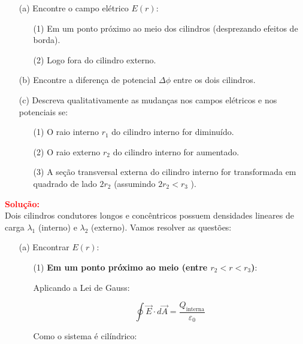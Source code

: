 \documentclass[a4paper,12pt]{article}
\begin{document}
\begin{flushleft}
\begin{enumerate}
    \item[(a)] Encontre o campo elétrico \( E(r) \):
    \begin{enumerate}
        \item[(1)] Em um ponto próximo ao meio dos cilindros (desprezando efeitos de borda).
        \item[(2)] Logo fora do cilindro externo.
    \end{enumerate}

    \item[(b)] Encontre a diferença de potencial $\Delta\phi$ entre os dois cilindros.

    \item[(c)] Descreva qualitativamente as mudanças nos campos elétricos e nos potenciais se:
    \begin{enumerate}
        \item[(1)] O raio interno \( r_1 \) do cilindro interno for diminuído.
        \item[(2)] O raio externo \( r_2 \) do cilindro interno for aumentado.
        \item[(3)] A seção transversal externa do cilindro interno for transformada em
                   quadrado de lado \( 2r_2 \) (assumindo \( 2r_2 < r_3 \) ).
    \end{enumerate}
\end{enumerate}

\textcolor{red}{\textbf{Solução:}}\\

Dois cilindros condutores longos e concêntricos possuem densidades lineares de carga $\lambda_1$ (interno) e $\lambda_2$ (externo). Vamos resolver as questões:

\begin{itemize}
    \item[(a)] Encontrar $E(r)$:

    \begin{itemize}
        \item[(1)] \textbf{Em um ponto próximo ao meio (entre $r_2 < r < r_3$)}:

        Aplicando a Lei de Gauss:

        \begin{equation}
        \oint \vec{E} \cdot d\vec{A} = \frac{Q_{\text{interna}}}{\varepsilon_0}
        \end{equation}

        Como o sistema é cilíndrico:


\end{itemize}
\end{itemize}
\end{flushleft}
\end{document}
